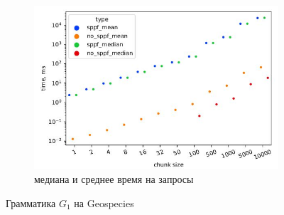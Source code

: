 \documentclass[14pt]{matmex-diploma-custom}
\theoremstyle{definition}
\begin{document}
\begin{figure}[H]
\begin{subfigure}[b]{0.5\textwidth}
    \includegraphics[width=\textwidth]{pics/geo_st_mean&median.pdf_1.jpg}  \caption{медиана и среднее время на запросы}
    \label{fig:subim0}
    \end{subfigure} \caption{Грамматика $G_1$ на Geospecies}
    \label{geo}
    \end{figure}
\end{document}
